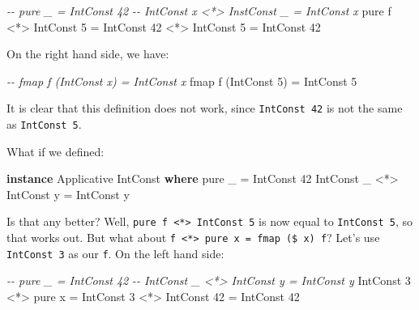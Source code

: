 \documentclass[]{article}
\newenvironment{Shaded}{}{}
\newcommand{\CommentTok}[1]{\textcolor[rgb]{0.38,0.63,0.69}{\textit{#1}}}
\newcommand{\DataTypeTok}[1]{\textcolor[rgb]{0.56,0.13,0.00}{#1}}
\newcommand{\DecValTok}[1]{\textcolor[rgb]{0.25,0.63,0.44}{#1}}
\newcommand{\FunctionTok}[1]{\textcolor[rgb]{0.02,0.16,0.49}{#1}}
\newcommand{\KeywordTok}[1]{\textcolor[rgb]{0.00,0.44,0.13}{\textbf{#1}}}
\newcommand{\NormalTok}[1]{#1}
\newcommand{\OperatorTok}[1]{\textcolor[rgb]{0.40,0.40,0.40}{#1}}
\newcommand{\OtherTok}[1]{\textcolor[rgb]{0.00,0.44,0.13}{#1}}
\begin{document}
\begin{Shaded}
\begin{Highlighting}[]
\CommentTok{{-}{-} pure \_                     = IntConst 42}
\CommentTok{{-}{-} IntConst x \textless{}*\textgreater{} InstConst \_ = IntConst x}
\FunctionTok{pure}\NormalTok{ f }\OperatorTok{\textless{}*\textgreater{}} \DataTypeTok{IntConst} \DecValTok{5} \OtherTok{=} \DataTypeTok{IntConst} \DecValTok{42} \OperatorTok{\textless{}*\textgreater{}} \DataTypeTok{IntConst} \DecValTok{5}
                      \OtherTok{=} \DataTypeTok{IntConst} \DecValTok{42}
\end{Highlighting}
\end{Shaded}

On the right hand side, we have:

\begin{Shaded}
\begin{Highlighting}[]
\CommentTok{{-}{-} fmap f (IntConst x) = IntConst x}
\FunctionTok{fmap}\NormalTok{ f (}\DataTypeTok{IntConst} \DecValTok{5}\NormalTok{) }\OtherTok{=} \DataTypeTok{IntConst} \DecValTok{5}
\end{Highlighting}
\end{Shaded}

It is clear that this definition does not work, since \texttt{IntConst\ 42} is
not the same as \texttt{IntConst\ 5}.

What if we defined:

\begin{Shaded}
\begin{Highlighting}[]
\KeywordTok{instance} \DataTypeTok{Applicative} \DataTypeTok{IntConst} \KeywordTok{where}
    \FunctionTok{pure}\NormalTok{ \_                    }\OtherTok{=} \DataTypeTok{IntConst} \DecValTok{42}
    \DataTypeTok{IntConst}\NormalTok{ \_ }\OperatorTok{\textless{}*\textgreater{}} \DataTypeTok{IntConst}\NormalTok{ y }\OtherTok{=} \DataTypeTok{IntConst}\NormalTok{ y}
\end{Highlighting}
\end{Shaded}

Is that any better? Well,
\texttt{pure\ f\ \textless{}*\textgreater{}\ IntConst\ 5} is now equal to
\texttt{IntConst\ 5}, so that works out. But what about
\texttt{f\ \textless{}*\textgreater{}\ pure\ x\ =\ fmap\ (\$\ x)\ f}? Let's use
\texttt{IntConst\ 3} as our \texttt{f}. On the left hand side:

\begin{Shaded}
\begin{Highlighting}[]
\CommentTok{{-}{-} pure \_                    = IntConst 42}
\CommentTok{{-}{-} IntConst \_ \textless{}*\textgreater{} IntConst y = IntConst y}
\DataTypeTok{IntConst} \DecValTok{3} \OperatorTok{\textless{}*\textgreater{}} \FunctionTok{pure}\NormalTok{ x }\OtherTok{=} \DataTypeTok{IntConst} \DecValTok{3} \OperatorTok{\textless{}*\textgreater{}} \DataTypeTok{IntConst} \DecValTok{42}
                      \OtherTok{=} \DataTypeTok{IntConst} \DecValTok{42}
\end{Highlighting}
\end{Shaded}
\end{document}
